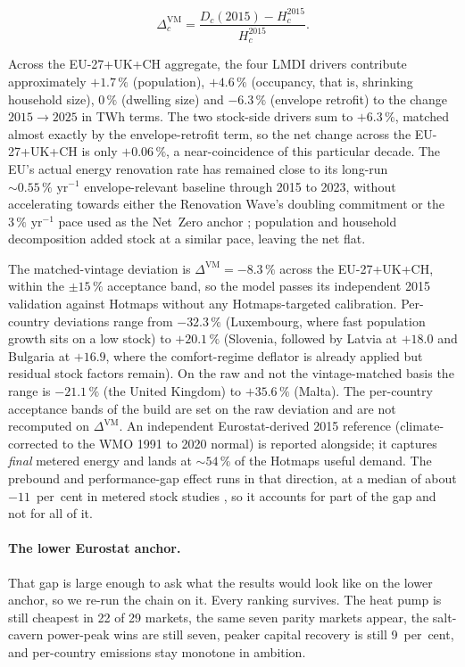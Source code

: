 \begin{equation}
    \Delta_c^{\mathrm{VM}} = \frac{D_c(2015) - H_c^{2015}}{H_c^{2015}}.
    \label{eq:vmgap}
\end{equation}

\noindent Across the EU-27+UK+CH aggregate, the four LMDI drivers contribute
approximately $+1.7\,\%$ (population), $+4.6\,\%$ (occupancy, that is, shrinking
household size), $0\,\%$ (dwelling size) and $-6.3\,\%$ (envelope retrofit) to the
change $2015\to2025$ in TWh terms. The two stock-side drivers sum to $+6.3\,\%$, matched
almost exactly by the envelope-retrofit term, so the net change across the EU-27+UK+CH is only $+0.06\,\%$, a near-coincidence of this particular decade. The EU's actual
energy renovation rate has remained close to its long-run $\sim 0.55\,\%\text{ yr}^{-1}$
envelope-relevant baseline through 2015 to 2023, without accelerating towards either the Renovation Wave's doubling commitment or the $3\,\%\text{ yr}^{-1}$ pace used as the Net~Zero anchor \citep{BPIE2024Tracker}; population and
household decomposition added stock at a similar pace, leaving the net flat.

The matched-vintage deviation is $\Delta^{\mathrm{VM}} = -8.3\,\%$ across the
EU-27+UK+CH, within the $\pm 15\,\%$ acceptance band, so the model passes its
independent 2015 validation against Hotmaps without any Hotmaps-targeted calibration.
Per-country deviations range from $-32.3\,\%$ (Luxembourg, where fast population growth
sits on a low stock) to $+20.1\,\%$ (Slovenia, followed by Latvia at $+18.0$ and
Bulgaria at $+16.9$, where the comfort-regime deflator is already applied but residual
stock factors remain). On the raw and not the vintage-matched basis the range is
$-21.1\,\%$ (the United Kingdom) to $+35.6\,\%$ (Malta). The per-country acceptance bands of the build are set on the raw deviation and are not recomputed on $\Delta^{\mathrm{VM}}$. An independent Eurostat-derived 2015 reference (climate-corrected to the WMO 1991 to
2020 normal) is reported alongside; it captures \emph{final} metered energy and lands at $\sim 54\,\%$ of the Hotmaps useful demand. The prebound and performance-gap effect runs in that direction, at a median of about $-11$~per~cent in metered stock studies \citep{Cozza2019Measuring}, so it accounts for part of the gap and not for all of it.

\paragraph{The lower Eurostat anchor.} That gap is large enough to ask what the results
would look like on the lower anchor, so we re-run the chain on it. Every ranking
survives. The heat pump is still cheapest in 22 of
29 markets, the same seven parity markets appear, the salt-cavern power-peak wins are
still seven, peaker capital recovery is still 9~per~cent, and per-country emissions stay
monotone in ambition.

